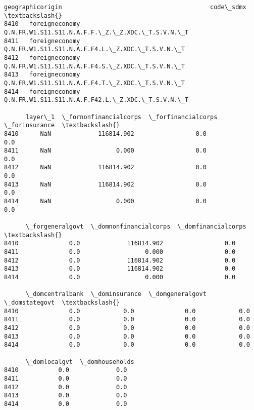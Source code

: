 \documentclass[11pt]{article}
\begin{document}
    \begin{Verbatim}[commandchars=\\\{\}]
     geographicorigin                                         code\_sdmx  \textbackslash{}
8410   foreigneconomy   Q.N.FR.W1.S11.S11.N.A.F.F.\_Z.\_Z.XDC.\_T.S.V.N.\_T
8411   foreigneconomy   Q.N.FR.W1.S11.S11.N.A.F.F4.L.\_Z.XDC.\_T.S.V.N.\_T
8412   foreigneconomy   Q.N.FR.W1.S11.S11.N.A.F.F4.S.\_Z.XDC.\_T.S.V.N.\_T
8413   foreigneconomy   Q.N.FR.W1.S11.S11.N.A.F.F4.T.\_Z.XDC.\_T.S.V.N.\_T
8414   foreigneconomy  Q.N.FR.W1.S11.S11.N.A.F.F42.L.\_Z.XDC.\_T.S.V.N.\_T

      layer\_1  \_fornonfinancialcorps  \_forfinancialcorps  \_forinsurance  \textbackslash{}
8410      NaN             116814.902                 0.0            0.0
8411      NaN                  0.000                 0.0            0.0
8412      NaN             116814.902                 0.0            0.0
8413      NaN             116814.902                 0.0            0.0
8414      NaN                  0.000                 0.0            0.0

      \_forgeneralgovt  \_domnonfinancialcorps  \_domfinancialcorps  \textbackslash{}
8410              0.0             116814.902                 0.0
8411              0.0                  0.000                 0.0
8412              0.0             116814.902                 0.0
8413              0.0             116814.902                 0.0
8414              0.0                  0.000                 0.0

      \_domcentralbank  \_dominsurance  \_domgeneralgovt  \_domstategovt  \textbackslash{}
8410              0.0            0.0              0.0            0.0
8411              0.0            0.0              0.0            0.0
8412              0.0            0.0              0.0            0.0
8413              0.0            0.0              0.0            0.0
8414              0.0            0.0              0.0            0.0

      \_domlocalgvt  \_domhouseholds
8410           0.0             0.0
8411           0.0             0.0
8412           0.0             0.0
8413           0.0             0.0
8414           0.0             0.0
    \end{Verbatim}
\end{document}
